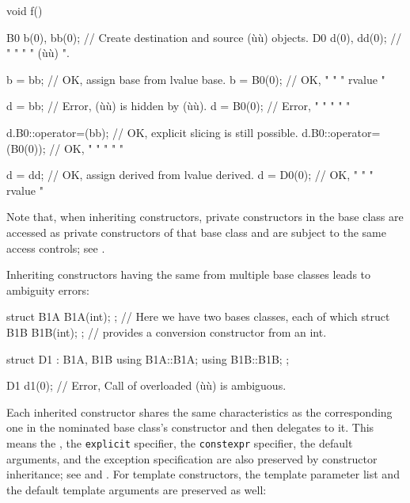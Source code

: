 \begin{emcppslisting}[emcppsbatch=e1]
void f()
{
    B0 b(0), bb(0);  // Create destination and source (ù{}ù) objects.
    D0 d(0), dd(0);  //   "         "       "    "    (ù{}ù)    ".

    b = bb;          // OK, assign base from lvalue base.
    b = B0(0);       // OK,   "       "   "  rvalue   "

    d = bb;          // Error, (ù{}ù) is hidden by (ù{}ù).
    d = B0(0);       // Error,       "         "    "     "        "

    d.B0::operator=(bb);     // OK, explicit slicing is still possible.
    d.B0::operator=(B0(0));  // OK,    "         "      "   "      "

    d = dd;          // OK, assign derived from lvalue derived.
    d = D0(0);       // OK,   "        "     "  rvalue    "
}
\end{emcppslisting}

\noindent Note that, when inheriting constructors, private constructors in the
base class are accessed as private constructors of that base class and
are subject to the same access controls; see .

Inheriting constructors having the same  from multiple
base classes leads to ambiguity errors:

\begin{emcppslisting}
struct B1A { B1A(int); }; // Here we have two bases classes, each of which
struct B1B { B1B(int); }; // provides a conversion constructor from an int.

struct D1 : B1A, B1B
{
    using B1A::B1A;
    using B1B::B1B;
};

D1 d1(0);  // Error, Call of overloaded (ù{}ù) is ambiguous.
\end{emcppslisting}

\noindent Each inherited constructor shares the same characteristics as the
corresponding one in the nominated base class's constructor and then
delegates to it. This means the , the
\lstinline!explicit! specifier, the \lstinline!constexpr! specifier, the
default arguments, and the exception specification are also preserved by
constructor inheritance; see  and .
For template
constructors, the template parameter list and the default template
arguments are preserved as well:

